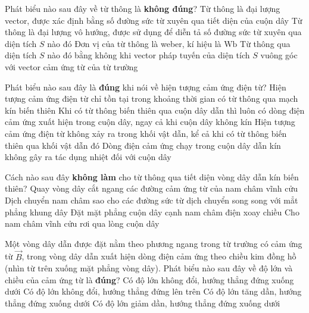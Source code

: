 \begin{ex}
	Phát biểu nào sau đây về từ thông là \textbf{không đúng}?
	\choice
	{\True Từ thông là đại lượng vector, được xác định bằng số đường sức từ xuyên qua tiết diện của cuộn dây}
	{Từ thông là đại lượng vô hướng, được sử dụng để diễn tả số đường sức từ xuyên qua diện tích $S$ nào đó}
	{Đơn vị của từ thông là weber, kí hiệu là $\si{\weber}$}
	{Từ thông qua diện tích $S$ nào đó bằng không khi vector pháp tuyến của diện tích $S$ vuông góc với vector cảm ứng từ của từ trường}
	\loigiai{	
	}
\end{ex}
\begin{ex}
	Phát biểu nào sau đây là \textbf{đúng} khi nói về hiện tượng cảm ứng điện từ?
	\choice
	{\True Hiện tượng cảm ứng điện từ chỉ tồn tại trong khoảng thời gian có từ thông qua mạch kín biến thiên}
	{Khi có từ thông biến thiên qua cuộn dây dẫn thì luôn có dòng điện cảm ứng xuất hiện trong cuộn dây, ngay cả khi cuộn dây không kín}
	{Hiện tượng cảm ứng điện từ không xảy ra trong khối vật dẫn, kể cả khi có từ thông biến thiên qua khối vật dẫn đó}
	{Dòng điện cảm ứng chạy trong cuộn dây dẫn kín không gây ra tác dụng nhiệt đối với cuộn dây}
	\loigiai{}
\end{ex}
\begin{ex}
	Cách nào sau đây \textbf{không làm} cho từ thông qua tiết diện vòng dây dẫn kín biến thiên?
	\choice
	{Quay vòng dây cắt ngang các đường cảm ứng từ của nam châm vĩnh cửu}
	{\True Dịch chuyển nam châm sao cho các đường sức từ dịch chuyển song song với mẳt phẳng khung dây}
	{Đặt mặt phẳng cuộn dây cạnh nam châm điện xoay chiều}
	{Cho nam châm vĩnh cửu rơi qua lòng cuộn dây}
	\loigiai{}
\end{ex}
\begin{ex}
	Một vòng dây dẫn được đặt nằm theo phương ngang trong từ trường có cảm ứng từ $\vec{B}$, trong vòng dây dẫn xuất hiện dòng điện cảm ứng theo chiều kim đồng hồ (nhìn từ trên xuống mặt phẳng vòng dây). Phát biểu nào sau đây về độ lớn và chiều của cảm ứng từ là \textbf{đúng}?
	\choice
	{Có độ lớn không đổi, hướng thẳng đứng xuống dưới}
	{Có độ lớn không đổi, hướng thẳng đứng lên trên}
	{Có độ lớn tăng dần, hướng thẳng đứng xuống dưới}
	{\True Có độ lớn giảm dần, hướng thẳng đứng xuống dưới}
	\loigiai{}
\end{ex}


